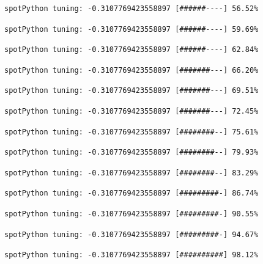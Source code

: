 \documentclass[
  letterpaper,
  DIV=11,
  numbers=noendperiod]{scrreprt}
\begin{document}
\begin{verbatim}
spotPython tuning: -0.3107769423558897 [######----] 56.52% 
\end{verbatim}

\begin{verbatim}
spotPython tuning: -0.3107769423558897 [######----] 59.69% 
\end{verbatim}

\begin{verbatim}
spotPython tuning: -0.3107769423558897 [######----] 62.84% 
\end{verbatim}

\begin{verbatim}
spotPython tuning: -0.3107769423558897 [#######---] 66.20% 
\end{verbatim}

\begin{verbatim}
spotPython tuning: -0.3107769423558897 [#######---] 69.51% 
\end{verbatim}

\begin{verbatim}
spotPython tuning: -0.3107769423558897 [#######---] 72.45% 
\end{verbatim}

\begin{verbatim}
spotPython tuning: -0.3107769423558897 [########--] 75.61% 
\end{verbatim}

\begin{verbatim}
spotPython tuning: -0.3107769423558897 [########--] 79.93% 
\end{verbatim}

\begin{verbatim}
spotPython tuning: -0.3107769423558897 [########--] 83.29% 
\end{verbatim}

\begin{verbatim}
spotPython tuning: -0.3107769423558897 [#########-] 86.74% 
\end{verbatim}

\begin{verbatim}
spotPython tuning: -0.3107769423558897 [#########-] 90.55% 
\end{verbatim}

\begin{verbatim}
spotPython tuning: -0.3107769423558897 [#########-] 94.67% 
\end{verbatim}

\begin{verbatim}
spotPython tuning: -0.3107769423558897 [##########] 98.12% 
\end{verbatim}
\end{document}
